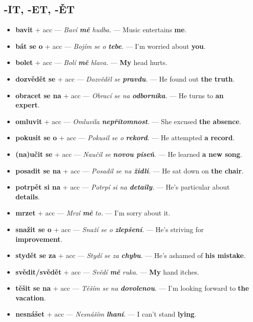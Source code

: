 \documentclass[12pt]{book}
\begin{document}
\subsection*{-IT, -ET, -ĚT}
\begin{itemize}
    \item \textbf{bavit} + acc --- \textit{Baví \textbf{mě} hudba.} --- Music entertains \textbf{me}.
    \item \textbf{bát se o} + acc --- \textit{Bojím se o \textbf{tebe}.} --- I'm worried about \textbf{you}.
    \item \textbf{bolet} + acc --- \textit{Bolí \textbf{mě} hlava.} --- \textbf{My} head hurts.
    \item \textbf{dozvědět se} + acc --- \textit{Dozvěděl se \textbf{pravdu}.} --- He found out \textbf{the truth}.
    \item \textbf{obracet se na} + acc --- \textit{Obrací se na \textbf{odborníka}.} --- He turns to \textbf{an expert}.
    \item \textbf{omluvit} + acc --- \textit{Omluvila \textbf{nepřítomnost}.} --- She excused \textbf{the absence}.
    \item \textbf{pokusit se o} + acc --- \textit{Pokusil se o \textbf{rekord}.} --- He attempted \textbf{a record}.
    \item \textbf{(na)učit se} + acc --- \textit{Naučil se \textbf{novou píseň}.} --- He learned \textbf{a new song}.
    \item \textbf{posadit se na} + acc --- \textit{Posadil se na \textbf{židli}.} --- He sat down on \textbf{the chair}.
    \item \textbf{potrpět si na} + acc --- \textit{Potrpí si na \textbf{detaily}.} --- He's particular about \textbf{details}.
    \item \textbf{mrzet} + acc --- \textit{Mrzí \textbf{mě} to.} --- I'm sorry about it.
    \item \textbf{snažit se o} + acc --- \textit{Snaží se o \textbf{zlepšení}.} --- He's striving for \textbf{improvement}.
    \item \textbf{stydět se za} + acc --- \textit{Stydí se za \textbf{chybu}.} --- He's ashamed of \textbf{his mistake}.
    \item \textbf{svědit/svědět} + acc --- \textit{Svědí \textbf{mě} ruka.} --- \textbf{My} hand itches.
    \item \textbf{těšit se na} + acc --- \textit{Těším se na \textbf{dovolenou}.} --- I'm looking forward to \textbf{the vacation}.
    \item \textbf{nesnášet} + acc --- \textit{Nesnáším \textbf{lhaní}.} --- I can't stand \textbf{lying}.

\end{itemize}
\end{document}
